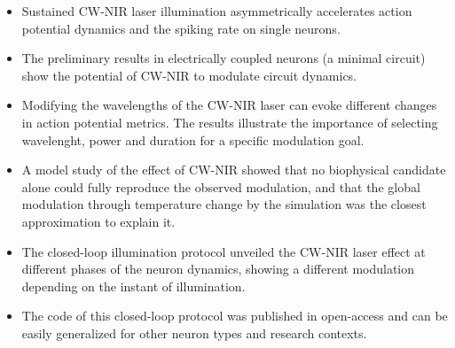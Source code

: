 \begin{itemize}
     \begin{itemize}
         \item Sustained CW-NIR laser illumination asymmetrically accelerates action potential dynamics and the spiking rate on single neurons.
         \item The preliminary results in electrically coupled neurons (a minimal circuit) show the potential of CW-NIR to modulate circuit dynamics.
         \item    Modifying the wavelengths of the CW-NIR laser can evoke different changes in action potential metrics. The results illustrate the importance of selecting  wavelenght, power and duration for a specific modulation goal.
         \item A model study of the effect of CW-NIR showed that no biophysical candidate alone could fully reproduce the observed modulation,  and that the global modulation through temperature change by the simulation was the closest approximation to explain it.
         \item The closed-loop illumination protocol unveiled the CW-NIR laser effect at different phases of the neuron dynamics, showing a different modulation depending on the instant of illumination.
         \item The code of this closed-loop protocol was published in open-access and can be easily generalized for other neuron types and research contexts.
     \end{itemize}
\end{itemize}
